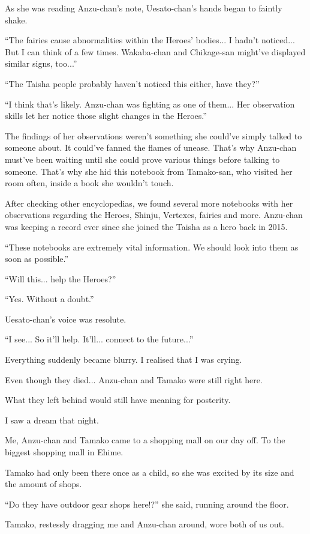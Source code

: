 As she was reading Anzu-chan's note, Uesato-chan's hands began to faintly shake.

``The fairies cause abnormalities within the Heroes' bodies... I hadn't noticed... But I can think of a few times. Wakaba-chan and Chikage-san might've displayed similar signs, too...''

``The Taisha people probably haven't noticed this either, have they?''

``I think that's likely. Anzu-chan was fighting as one of them... Her observation skills let her notice those slight changes in the Heroes.''

The findings of her observations weren't something she could've simply talked to someone about. It could've fanned the flames of unease. That's why Anzu-chan must've been waiting until she could prove various things before talking to someone. That's why she hid this notebook from Tamako-san, who visited her room often, inside a book she wouldn't touch.

After checking other encyclopedias, we found several more notebooks with her observations regarding the Heroes, Shinju, Vertexes, fairies and more. Anzu-chan was keeping a record ever since she joined the Taisha as a hero back in 2015.

``These notebooks are extremely vital information. We should look into them as soon as possible.''

``Will this... help the Heroes?''

``Yes. Without a doubt.''

Uesato-chan's voice was resolute.

``I see... So it'll help. It'll... connect to the future...''

Everything suddenly became blurry. I realised that I was crying.

Even though they died... Anzu-chan and Tamako were still right here.

What they left behind would still have meaning for posterity.

I saw a dream that night.

Me, Anzu-chan and Tamako came to a shopping mall on our day off. To the biggest shopping mall in Ehime.

Tamako had only been there once as a child, so she was excited by its size and the amount of shops.

``Do they have outdoor gear shops here!?'' she said, running around the floor.

Tamako, restessly dragging me and Anzu-chan around, wore both of us out.

